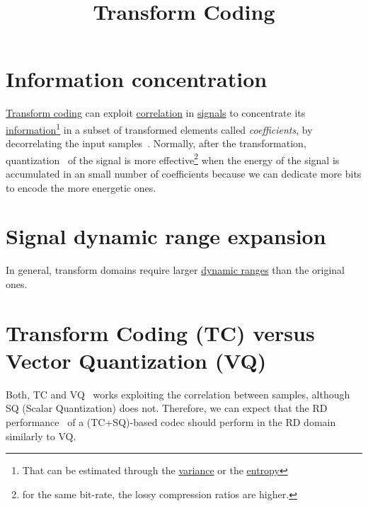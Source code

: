 \title{Transform Coding}

\maketitle
\tableofcontents

\section{Information concentration}

\href{https://web.stanford.edu/class/ee398a/handouts/lectures/07-TransformCoding.pdf}{Transform
  coding} can exploit
\href{https://en.wikipedia.org/wiki/Correlation_and_dependence}{correlation}
in \href{https://en.wikipedia.org/wiki/Signal}{signals} to concentrate
its
\href{https://en.wikipedia.org/wiki/Information}{information}\footnote{That
can be estimated through the
\href{https://en.wikipedia.org/wiki/Variance}{variance} or the
\href{https://en.wikipedia.org/wiki/Entropy}{entropy}} in a subset of
transformed elements called \emph{coefficients}, by decorrelating the
input samples~\cite{sayood2017introduction}. Normally, after the
transformation, quantization~\cite{vruiz__scalar_quantization} of the
signal is more effective\footnote{for the same bit-rate, the lossy
compression ratios are higher.} when the energy of the signal is
accumulated in an small number of coefficients because we can dedicate
more bits to encode the more energetic ones.


\section{Signal dynamic range expansion}
In general, transform domains require larger
\href{https://en.wikipedia.org/wiki/Dynamic_range}{dynamic ranges}
than the original ones.

\section{Transform Coding (TC) versus Vector Quantization (VQ)}

Both, TC and VQ~\cite{vruiz__vector_quantization} works exploiting the
correlation between samples, although SQ (Scalar Quantization) does
not. Therefore, we can expect that the RD
performance~\cite{vruiz__information_theory} of a (TC+SQ)-based codec
should perform in the RD domain similarly to VQ.

